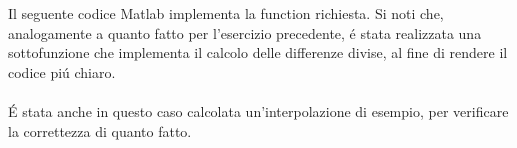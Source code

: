 \begin{center}
\footnotesize\noindent{}\end{center}

\noindent Il seguente codice Matlab implementa la function richiesta. Si noti che, analogamente a quanto fatto per l'esercizio precedente, \'e stata realizzata una sottofunzione che implementa il calcolo delle differenze divise, al fine di rendere il codice pi\'u chiaro. \\ \\
\noindent \'E stata anche in questo caso calcolata un'interpolazione di esempio, per verificare la correttezza di quanto fatto.


